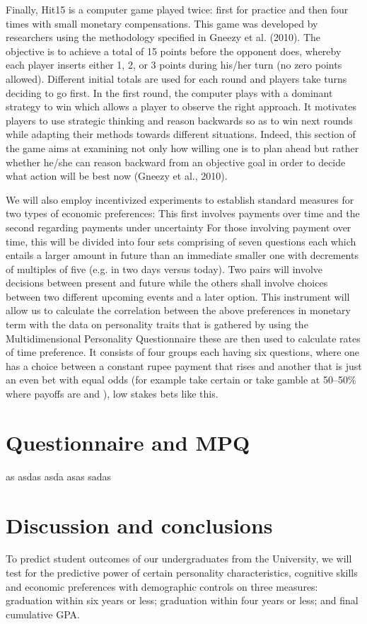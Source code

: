 \documentclass[12pt,a4paper]{article}
\begin{document}
{Finally, Hit15 is a computer game played twice: first for practice and then four times with small monetary compensations. This game was developed by researchers using the methodology specified in Gneezy et al. (2010)\cite{gneezy2010experience}. The objective is to achieve a total of 15 points before the opponent does, whereby each player inserts either 1, 2, or 3 points during his/her turn (no zero points allowed). Different initial totals are used for each round and players take turns deciding to go first. In the first round, the computer plays with a dominant strategy to win which allows a player to observe the right approach. It motivates players to use strategic thinking and reason backwards so as to win next rounds while adapting their methods towards different situations. Indeed, this section of the game aims at examining not only how willing one is to plan ahead but rather whether he/she can reason backward from an objective goal in order to decide what action will be best now (Gneezy et al., 2010).

We will also employ incentivized experiments to establish standard measures for two types of economic preferences: This first involves payments over time and the second regarding payments under uncertainty For those involving payment over time, this will be divided into four sets comprising of seven questions each which entails a larger amount in future than an immediate smaller one with decrements of multiples of five (e.g.  in two days versus  today). Two pairs will involve decisions between present and future while the others shall involve choices between two different upcoming events and a later option. This instrument will allow us to calculate the correlation between the above preferences in monetary term with the data on personality traits that is gathered by using the Multidimensional Personality Questionnaire these are then used to calculate rates of time preference. It consists of four groups each having six questions, where one has a choice between a constant rupee payment that rises and another that is just an even bet with equal odds (for example take certain  or take gamble at 50–50\% where payoffs are  and ), low stakes bets like this.\\
\newpage 
\section{Questionnaire and MPQ}
as
\newpage
asdas
\newpage
asda
\newpage
asas
\newpage
sadas
\newpage
\section{Discussion and conclusions}
To predict student outcomes of our undergraduates from the University, we will test for the predictive power of certain personality characteristics, cognitive skills and economic preferences with demographic controls on three measures: graduation within six years or less; graduation within four years or less; and final cumulative GPA.\\

}
\end{document}
